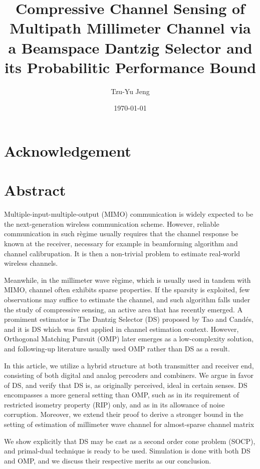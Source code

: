 \documentclass[12pt]{article}
\author{Tzu-Yu Jeng}
\date{\today}
\title{Compressive Channel Sensing of Multipath Millimeter Channel via a Beamspace Dantzig Selector and its Probabilitic Performance Bound}
\begin{document}
\maketitle

\section{Acknowledgement}


\section{Abstract}

Multiple-input-multiple-output (MIMO) communication is widely expected to be the next-generation wireless communication scheme.
However, reliable communication in such r\`egime usually requires that the channel response be known at the receiver, necessary for example in beamforming algorithm and channel calibrupation.
It is then a non-trivial problem to estimate real-world wireless channels.

Meanwhile, in the millimeter wave r\`egime, which is usually used in tandem with MIMO, channel often exhibits sparse properties.
If the sparsity is exploited, few observations may suffice to estimate the channel, and such algorithm falls under the study of compressive sensing, an active area that has recently emerged.
A promiment estimator is The Dantzig Selector (DS) proposed by Tao and Cand\'es, and it is DS which was first applied in channel estimation context.
However, Orthogonal Matching Pursuit (OMP) later emerges as a low-complexity solution, and following-up literature usually used OMP rather than DS as a result.

In this article, we utilize a hybrid structure at both transmitter and receiver end, consisting of both digital and analog percoders and combiners.
We argue in favor of DS, and verify that DS is, as originally perceived, ideal in certain senses.
DS encompasses a more general setting than OMP, such as in its requirement of restricted isometry property (RIP) only, and as in its allowance of noise corruption.
Moreover, we extend their proof to derive a stronger bound in the setting of estimation of millimeter wave channel for almost-sparse channel matrix

We show explicitly that DS may be cast as a second order cone problem (SOCP), and primal-dual technique is ready to be used.
Simulation is done with both DS and OMP, and we discuss their respective merits as our conclusion.
\end{document}

